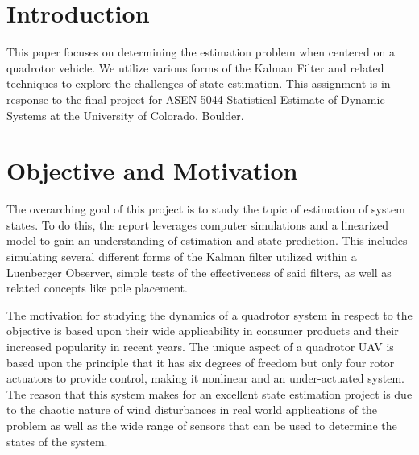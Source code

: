 \documentclass[12pt]{extarticle}
\begin{document}
\section{Introduction}{
This paper focuses on determining the estimation problem when centered on a quadrotor vehicle. We utilize various forms of the Kalman Filter and related techniques to explore the challenges of state estimation.  This assignment is in response to the final project for ASEN 5044 Statistical Estimate of Dynamic Systems at the University of Colorado, Boulder.
}
\section{Objective and Motivation}
The overarching goal of this project is to study the topic of estimation of system states. To do this, the report leverages computer simulations and a linearized model to gain an understanding of estimation and state prediction. This includes simulating several different forms of the Kalman filter utilized within a Luenberger Observer, simple tests of the effectiveness of said filters, as well as related concepts like pole placement. 

The motivation for studying the dynamics of a quadrotor system in respect to the objective is based upon their wide applicability in consumer products and their increased popularity in recent years.  The unique aspect of a quadrotor UAV is based upon the principle that it has six degrees of freedom but only four rotor actuators to provide control, making it nonlinear and an under-actuated system. The reason that this system makes for an excellent state estimation project is due to the chaotic nature of wind disturbances in real world applications of the problem as well as the wide range of sensors that can be used to determine the states of the system. 
\end{document}
